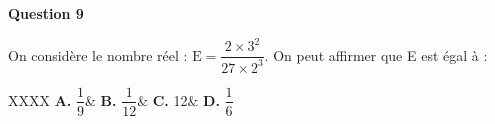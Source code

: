 	\medskip

	\textbf{Question 9}

	On considère le nombre réel : \quad $\text{E} =\dfrac{2 \times 3^{2}}{27 \times 2^{3}}$. \quad On peut affirmer que E est égal à :

	\begin{tblr}{XXXX}
		\textbf{A.} $\dfrac{1}{9}$&
		\textbf{B.} $\dfrac{1}{12}$&
		\textbf{C.} 12&
		\textbf{D.} $\dfrac{1}{6}$
	\end{tblr}
